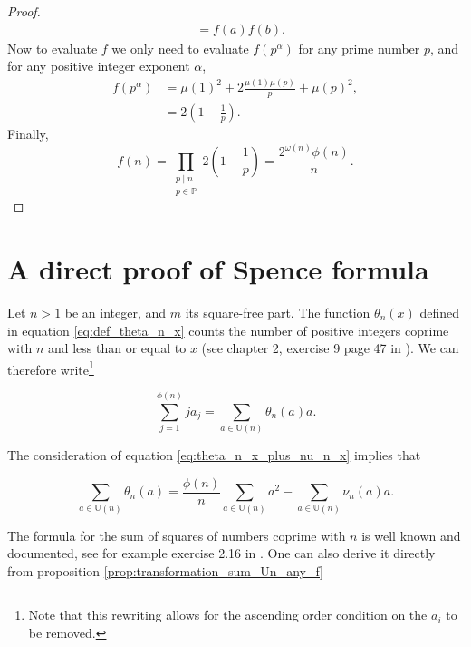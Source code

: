\documentclass[a4paper,12pt]{article}
\newcommand{\setU}[1]{\mathbb{U}\left( #1 \right)}
\begin{document}
\begin{proof}
\begin{align*}
&= f(a)f(b).
\end{align*}
Now to evaluate $f$ we only need to evaluate $f(p^\alpha)$ for any prime number $p$, and for any positive integer exponent $\alpha$,
\begin{align*}
f(p^\alpha)
&= \mu(1)^2 + 2\frac{\mu(1)\mu(p)}{p} + \mu(p)^2, \\
&= 2\left(1-\frac{1}{p}\right).
\end{align*}
Finally,
\begin{equation*}
f(n)=\prod_{\substack{p\mid n\\ p\in \mathbb{P}}}2\left(1-\frac{1}{p}\right)=\frac{2^{\omega(n)}\phi(n)}{n}.
\end{equation*}
\end{proof}

\section{A direct proof of Spence formula}

Let $n>1$ be an integer, and $m$ its square-free part. The function $\theta_n(x)$ defined in equation \ref{eq:def_theta_n_x} counts the number of positive integers coprime with $n$ and less than or equal to $x$ (see chapter 2, exercise 9 page 47 in \cite{apostol1976introduction}). We can therefore write\footnote{Note that this rewriting allows for the ascending order condition on the $a_i$ to be removed.}

\begin{equation}\label{eq:transform_jaj_thetanaa}
\sum_{j=1}^{\phi(n)}ja_j = \sum_{a\in \setU{n}}\theta_n(a)a.
\end{equation}

The consideration of equation \ref{eq:theta_n_x_plus_nu_n_x} implies that

\begin{equation}
\sum_{a\in \setU{n}}\theta_n(a) = \frac{\phi(n)}{n}\sum_{a\in \setU{n}}a^2  -\sum_{a\in \setU{n}}\nu_n(a)a. \label{eq:main}
\end{equation}

The formula for the sum of squares of numbers coprime with $n$ is well known and documented, see for example exercise 2.16 in \cite{apostol1976introduction}. One can also derive it directly from proposition \ref{prop:transformation_sum_Un_any_f}
\end{document}
